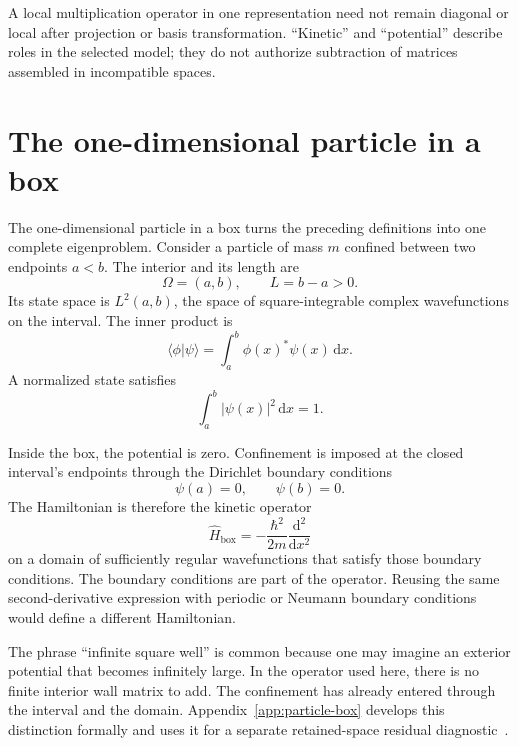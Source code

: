 A local multiplication operator in one representation need not remain diagonal
or local after projection or basis transformation. ``Kinetic'' and
``potential'' describe roles in the selected model; they do not authorize
subtraction of matrices assembled in incompatible spaces.

\section{The one-dimensional particle in a box}

The one-dimensional particle in a box turns the preceding definitions into one
complete eigenproblem. Consider a particle of mass \(m\) confined between two
endpoints \(a<b\). The interior and its length are
\begin{equation}
  \Omega=(a,b),
  \qquad
  L=b-a>0.
\end{equation}
Its state space is \(L^2(a,b)\), the space of square-integrable complex
wavefunctions on the interval. The inner product is
\begin{equation}
  \langle\phi\vert\psi\rangle
  =\int_a^b\phi(x)^*\psi(x)\,\mathrm{d}x.
\end{equation}
A normalized state satisfies
\begin{equation}
  \int_a^b |\psi(x)|^2\,\mathrm{d}x=1.
\end{equation}

Inside the box, the potential is zero. Confinement is imposed at the closed
interval's endpoints through the Dirichlet boundary conditions
\begin{equation}
  \psi(a)=0,
  \qquad
  \psi(b)=0.
\end{equation}
The Hamiltonian is therefore the kinetic operator
\begin{equation}
  \hat H_{\mathrm{box}}
  =-\frac{\hbar^2}{2m}\frac{\mathrm{d}^2}{\mathrm{d}x^2}
\end{equation}
on a domain of sufficiently regular wavefunctions that satisfy those boundary
conditions. The boundary conditions are part of the operator. Reusing the same
second-derivative expression with periodic or Neumann boundary conditions would
define a different Hamiltonian.

The phrase ``infinite square well'' is common because one may imagine an
exterior potential that becomes infinitely large. In the operator used here,
there is no finite interior wall matrix to add. The confinement has already
entered through the interval and the domain. Appendix~\ref{app:particle-box}
develops this distinction formally and uses it for a separate retained-space
residual diagnostic~\cite{bonneau2001,angelone2024}.

